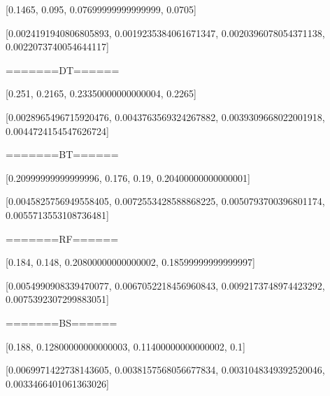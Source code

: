 \documentclass[12pt]{article}
\begin{document}
[0.1465, 0.095, 0.07699999999999999, 0.0705]

[0.0024191940806805893, 0.0019235384061671347, 0.0020396078054371138, 0.0022073740054644117]

=======DT======

[0.251, 0.2165, 0.23350000000000004, 0.2265]

[0.0028965496715920476, 0.0043763569324267882, 0.0039309668022001918, 0.0044724154547626724]

=======BT======

[0.20999999999999996, 0.176, 0.19, 0.20400000000000001]

[0.0045825756949558405, 0.0072553428588868225, 0.0050793700396801174, 0.0055713553108736481]

=======RF======

[0.184, 0.148, 0.20800000000000002, 0.18599999999999997]

[0.0054990908339470077, 0.0067052218456960843, 0.0092173748974423292, 0.0075392307299883051]

=======BS======

[0.188, 0.12800000000000003, 0.11400000000000002, 0.1]

[0.0069971422738143605, 0.0038157568056677834, 0.0031048349392520046, 0.0033466401061363026]
\\
\end{document}
